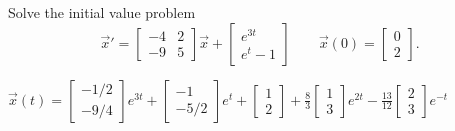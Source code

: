 \begin{exercise}
Solve the initial value problem
\[ {\vec{x}}' = \begin{bmatrix} -4 & 2 \\ -9 & 5 \end{bmatrix}\vec{x} + \begin{bmatrix} e^{3t} \\ e^t - 1 \end{bmatrix} \qquad \vec{x}(0) = \begin{bmatrix} 0 \\ 2 \end{bmatrix}. \]
\end{exercise}
\comboSol{%
}
{%
$\vec{x}(t) = \left[\begin{smallmatrix} -1/2 \\ -9/4 \end{smallmatrix}\right]e^{3t} + \left[\begin{smallmatrix} -1 \\ -5/2 \end{smallmatrix}\right]e^t + \left[\begin{smallmatrix} 1 \\ 2 \end{smallmatrix}\right] + \frac{8}{3}\left[\begin{smallmatrix} 1 \\ 3 \end{smallmatrix}\right]e^{2t} - \frac{13}{12} \left[\begin{smallmatrix} 2 \\ 3 \end{smallmatrix}\right]e^{-t}$
}

